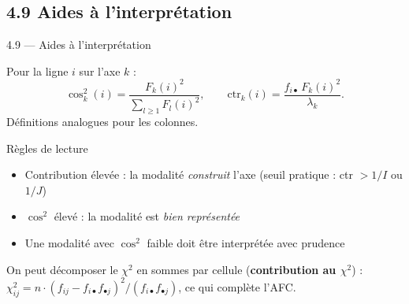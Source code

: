 \subsection{4.9 Aides à l'interprétation}
\begin{frame}{4.9 — Aides à l'interprétation}
\begin{definition}
Pour la ligne $i$ sur l'axe $k$ :
\[
\cos^2_k(i) = \frac{F_k(i)^2}{\sum_{l \geq 1} F_l(i)^2},
\qquad
\text{ctr}_k(i) = \frac{f_{i\bullet}\, F_k(i)^2}{\lambda_k}.
\]
Définitions analogues pour les colonnes.
\end{definition}

\begin{block}{Règles de lecture}
\begin{itemize}\small
  \item \alert{Contribution élevée} : la modalité \emph{construit} l'axe
        (seuil pratique : ctr $> 1/I$ ou $1/J$)
  \item \alert{$\cos^2$ élevé} : la modalité est \emph{bien représentée}
  \item Une modalité avec $\cos^2$ faible doit être interprétée avec prudence
\end{itemize}
\end{block}

\begin{rema}
\small On peut décomposer le $\chi^2$ en sommes par cellule (\textbf{contribution
au $\chi^2$}) :
$\chi^2_{ij} = n \cdot (f_{ij} - f_{i\bullet}f_{\bullet j})^2 / (f_{i\bullet}f_{\bullet j})$,
ce qui complète l'AFC.
\end{rema}
\end{frame}

